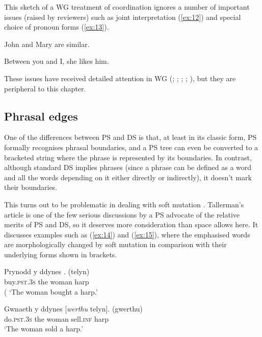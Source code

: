 \documentclass[output=paper
 	        ,biblatex
                ,babelshorthands
                ,newtxmath
                ,draftmode
                ,colorlinks, citecolor=brown
]{langscibook}
\begin{document}
This sketch of a WG treatment of coordination ignores a number of important issues (raised by
reviewers) such as joint interpretation (\ref{ex:12}) and special choice of pronoun forms
(\ref{ex:13}).

\begin{exe}
	\ex \label{ex:12} John and Mary are similar.

	\ex \label{ex:13} Between you and I, she likes him.
\end{exe}

\noindent
These issues have received detailed attention in WG (\citealt[Chapter~5]{Hudson84a-u};
\citeyear{Hudson88a}; \citeyear[Chapter~14]{Hudson90a-u}; \citeyear{Hudson1995}; \citeyear[175--181,
304--307]{Hudson2010b-u}), but they are peripheral to this chapter.


\subsection{Phrasal edges}
\label{sec:4.3}

One of the differences between PS and DS is that, at least in its classic form, PS formally
recognises phrasal boundaries, and a PS tree can even be converted to a bracketed string where the
phrase is represented by its boundaries. In contrast, although standard DS implies phrases (since a
phrase can be defined as a word and all the words depending on it either directly or indirectly), it
doesn't mark their boundaries.

This turns out to be problematic in dealing with  soft mutation
\citep{Tallerman2009}. Tallerman's article is one of the few serious discussions by a PS advocate of
the relative merits of PS and DS, so it deserves more consideration than space allows here. It
discusses examples such as (\ref{ex:14}) and (\ref{ex:15}), where the emphasised words are
morphologically changed by soft mutation in comparison with their underlying forms shown in
brackets.

\begin{exe}
\ex \label{ex:14}
\gll Prynodd                      y   ddynes \emph{}. (telyn)\\
     buy.\textsc{pst}.3\textsc{s} the woman  harp\\\hfill(
\glt `The woman bought a harp.'

\ex \label{ex:15}
\gll Gwnaeth                     y   ddynes [\emph{werthu} telyn]. (gwerthu)\\
     do.\textsc{pst}.3\textsc{s} the woman  \spacebr{}sell.\textsc{inf} harp\\
\glt `The woman sold a harp.'
\end{exe}
\end{document}

